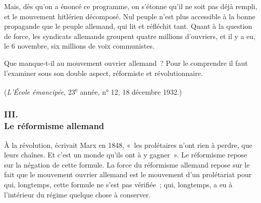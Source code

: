 \documentclass[french,twoside]{book} %
\begin{document}
Mais, dès qu'on a énoncé ce programme, on s'étonne qu'il ne soit pas déjà rempli, et le mouvement hitlérien décomposé. Nul peuple n'est plus accessible à la bonne propagande que le peuple allemand, qui lit et réfléchit tant. Quant à la question de force, les syndicats allemands groupent quatre millions d'ouvriers, et il y a eu, le 6 novembre, six millions de voix communistes.\par
Que manque-t-il au mouvement ouvrier allemand ? Pour le comprendre il faut l'examiner sous son double aspect, réformiste et révolutionnaire.\par
({\itshape L'École émancipée}, 23\textsuperscript{e} année, n° 12, 18 décembre 1932.)
\subsubsection[{III. Le réformisme allemand}]{III. \\
Le réformisme allemand}
\noindent À la révolution, écrivait Marx en 1848, « les prolétaires n'ont rien à perdre, que leurs chaînes. Et c'est un monde qu'ils ont à y gagner ». Le réformisme repose sur la négation de cette formule. La force du réformisme allemand repose sur le fait que le mouvement ouvrier allemand est le mouve­ment d'un prolétariat pour qui, longtemps, cette formule ne s'est pas vérifiée ; qui, longtemps, a eu à l'intérieur du régime quelque chose à conserver.\par
\par
\end{document}
